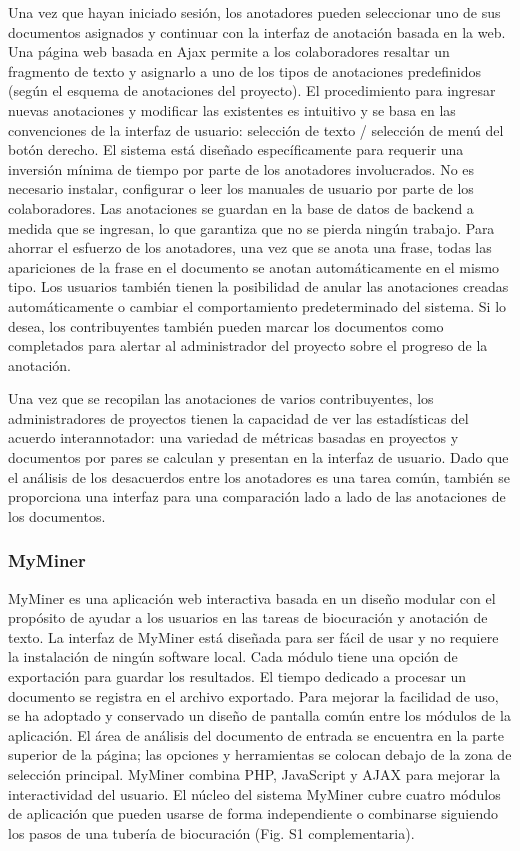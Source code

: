 Una vez que hayan iniciado sesión, los anotadores pueden seleccionar uno de sus documentos asignados y continuar con la interfaz de anotación basada en la web. Una página web basada en Ajax permite a los colaboradores resaltar un fragmento de texto y asignarlo a uno de los tipos de anotaciones predefinidos (según el esquema de anotaciones del proyecto). El procedimiento para ingresar nuevas anotaciones y modificar las existentes es intuitivo y se basa en las convenciones de la interfaz de usuario: selección de texto / selección de menú del botón derecho. El sistema está diseñado específicamente para requerir una inversión mínima de tiempo por parte de los anotadores involucrados. No es necesario instalar, configurar o leer los manuales de usuario por parte de los colaboradores. Las anotaciones se guardan en la base de datos de backend a medida que se ingresan, lo que garantiza que no se pierda ningún trabajo. Para ahorrar el esfuerzo de los anotadores, una vez que se anota una frase, todas las apariciones de la frase en el documento se anotan automáticamente en el mismo tipo. Los usuarios también tienen la posibilidad de anular las anotaciones creadas automáticamente o cambiar el comportamiento predeterminado del sistema. Si lo desea, los contribuyentes también pueden marcar los documentos como completados para alertar al administrador del proyecto sobre el progreso de la anotación.

Una vez que se recopilan las anotaciones de varios contribuyentes, los administradores de proyectos tienen la capacidad de ver las estadísticas del acuerdo interannotador: una variedad de métricas basadas en proyectos y documentos por pares se calculan y presentan en la interfaz de usuario. Dado que el análisis de los desacuerdos entre los anotadores es una tarea común, también se proporciona una interfaz para una comparación lado a lado de las anotaciones de los documentos.

\subsubsection*{MyMiner}

MyMiner es una aplicación web interactiva basada en un diseño modular con el propósito de ayudar a los usuarios en las tareas de biocuración y anotación de texto. La interfaz de MyMiner está diseñada para ser fácil de usar y no requiere la instalación de ningún software local. Cada módulo tiene una opción de exportación para guardar los resultados. El tiempo dedicado a procesar un documento se registra en el archivo exportado. Para mejorar la facilidad de uso, se ha adoptado y conservado un diseño de pantalla común entre los módulos de la aplicación. El área de análisis del documento de entrada se encuentra en la parte superior de la página; las opciones y herramientas se colocan debajo de la zona de selección principal. MyMiner combina PHP, JavaScript y AJAX para mejorar la interactividad del usuario. El núcleo del sistema MyMiner cubre cuatro módulos de aplicación que pueden usarse de forma independiente o combinarse siguiendo los pasos de una tubería de biocuración (Fig. S1 complementaria).


